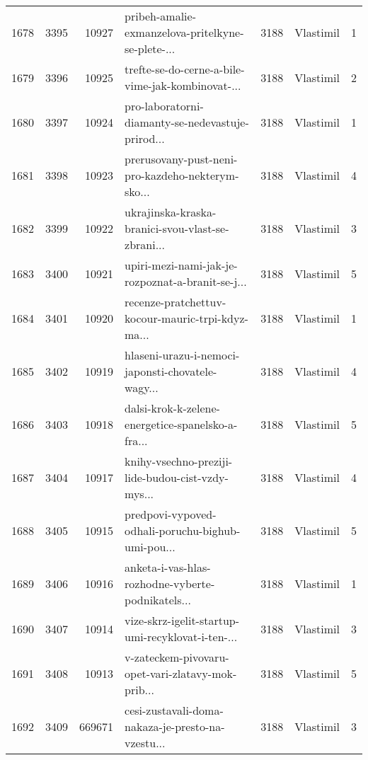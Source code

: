\begin{tabular}{lrrlrlr}
1678 &       3395 &    10927 &  pribeh-amalie-exmanzelova-pritelkyne-se-plete-... &     3188 &                    Vlastimil &               1 \\
1679 &       3396 &    10925 &  trefte-se-do-cerne-a-bile-vime-jak-kombinovat-... &     3188 &                    Vlastimil &               2 \\
1680 &       3397 &    10924 &  pro-laboratorni-diamanty-se-nedevastuje-prirod... &     3188 &                    Vlastimil &               1 \\
1681 &       3398 &    10923 &  prerusovany-pust-neni-pro-kazdeho-nekterym-sko... &     3188 &                    Vlastimil &               4 \\
1682 &       3399 &    10922 &  ukrajinska-kraska-branici-svou-vlast-se-zbrani... &     3188 &                    Vlastimil &               3 \\
1683 &       3400 &    10921 &  upiri-mezi-nami-jak-je-rozpoznat-a-branit-se-j... &     3188 &                    Vlastimil &               5 \\
1684 &       3401 &    10920 &  recenze-pratchettuv-kocour-mauric-trpi-kdyz-ma... &     3188 &                    Vlastimil &               1 \\
1685 &       3402 &    10919 &  hlaseni-urazu-i-nemoci-japonsti-chovatele-wagy... &     3188 &                    Vlastimil &               4 \\
1686 &       3403 &    10918 &  dalsi-krok-k-zelene-energetice-spanelsko-a-fra... &     3188 &                    Vlastimil &               5 \\
1687 &       3404 &    10917 &  knihy-vsechno-preziji-lide-budou-cist-vzdy-mys... &     3188 &                    Vlastimil &               4 \\
1688 &       3405 &    10915 &  predpovi-vypoved-odhali-poruchu-bighub-umi-pou... &     3188 &                    Vlastimil &               5 \\
1689 &       3406 &    10916 &  anketa-i-vas-hlas-rozhodne-vyberte-podnikatels... &     3188 &                    Vlastimil &               1 \\
1690 &       3407 &    10914 &  vize-skrz-igelit-startup-umi-recyklovat-i-ten-... &     3188 &                    Vlastimil &               3 \\
1691 &       3408 &    10913 &  v-zateckem-pivovaru-opet-vari-zlatavy-mok-prib... &     3188 &                    Vlastimil &               5 \\
1692 &       3409 &   669671 &  cesi-zustavali-doma-nakaza-je-presto-na-vzestu... &     3188 &                    Vlastimil &               3 \\

\end{tabular}
